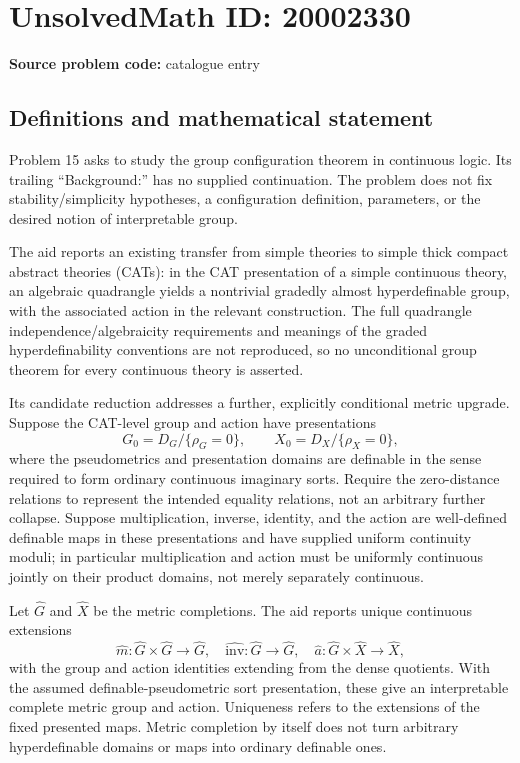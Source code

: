 \documentclass[11pt]{article}
\begin{document}
\section*{UnsolvedMath ID: 20002330}
\textbf{Source problem code:} catalogue entry
\subsection{Definitions and mathematical statement}
Problem 15 asks to study the group configuration theorem in continuous logic. Its trailing ``Background:'' has no supplied continuation. The problem does not fix stability/simplicity hypotheses, a configuration definition, parameters, or the desired notion of interpretable group.

The aid reports an existing transfer from simple theories to simple thick compact abstract theories (CATs): in the CAT presentation of a simple continuous theory, an algebraic quadrangle yields a nontrivial gradedly almost hyperdefinable group, with the associated action in the relevant construction. The full quadrangle independence/algebraicity requirements and meanings of the graded hyperdefinability conventions are not reproduced, so no unconditional group theorem for every continuous theory is asserted.

Its candidate reduction addresses a further, explicitly conditional metric upgrade. Suppose the CAT-level group and action have presentations
\[
 G_0=D_G/\{\rho_G=0\},\qquad X_0=D_X/\{\rho_X=0\},
\]
where the pseudometrics and presentation domains are definable in the sense required to form ordinary continuous imaginary sorts. Require the zero-distance relations to represent the intended equality relations, not an arbitrary further collapse. Suppose multiplication, inverse, identity, and the action are well-defined definable maps in these presentations and have supplied uniform continuity moduli; in particular multiplication and action must be uniformly continuous jointly on their product domains, not merely separately continuous.

Let \(\widehat G\) and \(\widehat X\) be the metric completions. The aid reports unique continuous extensions
\[
 \widehat m:\widehat G\times\widehat G\to\widehat G,
 \quad\widehat{\mathrm{inv}}:\widehat G\to\widehat G,
 \quad\widehat a:\widehat G\times\widehat X\to\widehat X,
\]
with the group and action identities extending from the dense quotients. With the assumed definable-pseudometric sort presentation, these give an interpretable complete metric group and action. Uniqueness refers to the extensions of the fixed presented maps. Metric completion by itself does not turn arbitrary hyperdefinable domains or maps into ordinary definable ones.
\end{document}
